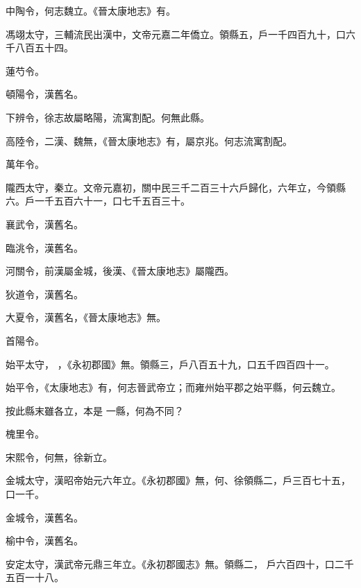 \begin{pinyinscope}
 中陶令，何志魏立。《晉太康地志》有。



 馮翊太守，三輔流民出漢中，文帝元嘉二年僑立。領縣五，戶一千四百九十，口六千八百五十四。


蓮芍令。



 頓陽令，漢舊名。



 下辨令，徐志故屬略陽，流寓割配。何無此縣。



 高陸令，二漢、魏無，《晉太康地志》有，屬京兆。何志流寓割配。


萬年令。



 隴西太守，秦立。文帝元嘉初，關中民三千二百三十六戶歸化，六年立，今領縣六。戶一千五百六十一，口七千五百三十。



 襄武令，漢舊名。



 臨洮令，漢舊名。



 河關令，前漢屬金城，後漢、《晉太康地志》屬隴西。



 狄道令，漢舊名。



 大夏令，漢舊名，《晉太康地志》無。



 首陽令。


始平太守，
 ，《永初郡國》無。領縣三，戶八百五十九，口五千四百四十一。



 始平令，《太康地志》有，何志晉武帝立；而雍州始平郡之始平縣，何云魏立。



 按此縣末雖各立，本是
 一縣，何為不同？


槐里令。



 宋熙令，何無，徐新立。



 金城太守，漢昭帝始元六年立。《永初郡國》無，何、徐領縣二，戶三百七十五，口一千。



 金城令，漢舊名。



 榆中令，漢舊名。



 安定太守，漢武帝元鼎三年立。《永初郡國志》無。領縣二，
 戶六百四十，口二千五百一十八。




\end{pinyinscope}
